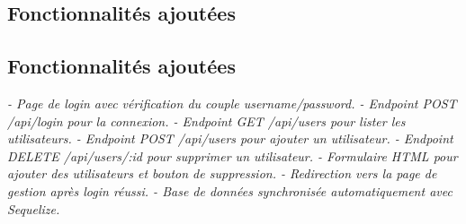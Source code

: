 \documentclass[11pt,a4paper]{article}
\begin{document}
\subsection{Fonctionnalités ajoutées}
\subsection{Fonctionnalités ajoutées}
\textit{
- Page de login avec vérification du couple username/password.
- Endpoint POST /api/login pour la connexion.
- Endpoint GET /api/users pour lister les utilisateurs.
- Endpoint POST /api/users pour ajouter un utilisateur.
- Endpoint DELETE /api/users/:id pour supprimer un utilisateur.
- Formulaire HTML pour ajouter des utilisateurs et bouton de suppression.
- Redirection vers la page de gestion après login réussi.
- Base de données synchronisée automatiquement avec Sequelize.
}
\end{document}
